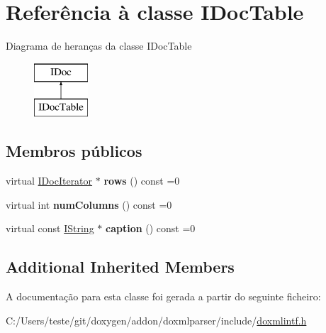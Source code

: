\hypertarget{class_i_doc_table}{\section{Referência à classe I\-Doc\-Table}
\label{class_i_doc_table}
}
Diagrama de heranças da classe I\-Doc\-Table\begin{figure}[H]
\begin{center}
\leavevmode
\includegraphics[height=2.000000cm]{class_i_doc_table}
\end{center}
\end{figure}
\subsection*{Membros públicos}
\begin{DoxyCompactItemize}
\item 
\hypertarget{class_i_doc_table_a96d4cbad0adaa932d1942c81e2401c50}{virtual \hyperlink{class_i_doc_iterator}{I\-Doc\-Iterator} $\ast$ {\bfseries rows} () const =0}\label{class_i_doc_table_a96d4cbad0adaa932d1942c81e2401c50}

\item 
\hypertarget{class_i_doc_table_a0b976ffae4503c43eeaf224e767e6f4b}{virtual int {\bfseries num\-Columns} () const =0}\label{class_i_doc_table_a0b976ffae4503c43eeaf224e767e6f4b}

\item 
\hypertarget{class_i_doc_table_a905140ec6bc1486d8f85deaa25657f28}{virtual const \hyperlink{class_i_string}{I\-String} $\ast$ {\bfseries caption} () const =0}\label{class_i_doc_table_a905140ec6bc1486d8f85deaa25657f28}

\end{DoxyCompactItemize}
\subsection*{Additional Inherited Members}


A documentação para esta classe foi gerada a partir do seguinte ficheiro\-:\begin{DoxyCompactItemize}
\item 
C\-:/\-Users/teste/git/doxygen/addon/doxmlparser/include/\hyperlink{include_2doxmlintf_8h}{doxmlintf.\-h}\end{DoxyCompactItemize}
